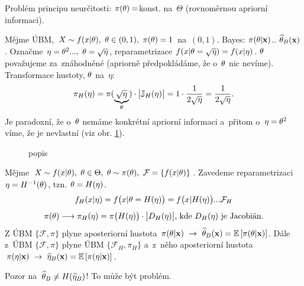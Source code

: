Problém principu neurčitosti: $\pi(\theta)=$konst. na~$\Theta$ (rovnoměrnou apriorní informaci).
\begin{example}
	Mějme ÚBM, $X\sim f(x|\theta),~\theta\in(0,1),~\pi(\theta)=1$ na~$(0,1)$. Bayes: $\pi(\theta|\textbf{x})$.. $\widehat{\theta}_B(\textbf{x})$. Označme $\eta=\theta^2...,~\theta=\sqrt{\eta}$, reparametrizace $f(x|\theta=\sqrt{\eta})=f(x|\eta)$. $\theta$ považujeme za~znáhodněné (apriorně předpokládáme, že o~$\theta$ nic nevíme). Transformace hustoty, $\theta$ na~$\eta$: $$\pi_H(\eta)=\pi(\underbrace{\sqrt{\eta}}_{\theta})\cdot\big|\mathbb{J}_H(\eta)\big|=1\cdot\frac{1}{2\sqrt{\eta}}=\frac{1}{2\sqrt{\eta}}.$$
	Je paradoxní, že o~$\theta$ nemáme konkrétní apriorní informaci a~přitom o~$\eta=\theta^2$ víme, že je nevlastní (viz obr. \ref{fig:p71}).
\begin{figure}[h]
	\centering
	\caption{popis}
	\label{fig:p71}
\end{figure}

\end{example}
\begin{example}
	Mějme $X\sim f(x|\theta),~\theta\in\Theta,~\theta\sim\pi(\theta),~\mathcal{F}=\{f(x|\theta)\}$. Zavedeme reparametrizaci $\eta=H^{-1}(\theta)$, tzn. $\theta=H(\eta)$. 
	$$ f_H(x|\eta)=f\big(x|\theta=H(\eta)\big)=f\big(x|H(\eta)\big)...\mathcal{F}_H$$
	$$\pi(\theta)\longrightarrow \pi_H(\eta)=\pi\big(H(\eta)\big)\cdot\big|D_H(\eta)\big| \text{, kde } D_H(\eta) \text{ je Jacobián.}  $$
	Z ÚBM $\{\mathcal{F},\pi\}$ plyne aposteriorní hustota $\pi(\theta|\textbf{x})~\to~\widehat{\theta}_B(\textbf{x})=\mathbb{E}\left[ \pi(\theta|\textbf{x}) \right]$. Dále z~ÚBM $\{\mathcal{F},\pi\}$ plyne ÚBM $\{\mathcal{F}_H,\pi_H\}$ a~z~něho aposteriorní hustota $\pi(\eta|\textbf{x})~\to~ \widehat{\eta}_B(\textbf{x})=\mathbb{E}\left[ \pi(\eta|\textbf{x}) \right]$. 
	
	Pozor na~$\widehat{\theta}_B\neq H(\widehat{\eta}_B)$! To může být problém.
\end{example}
